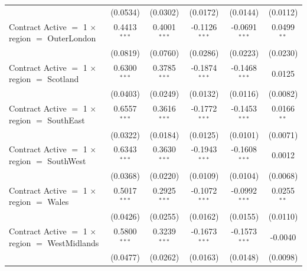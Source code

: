 \begin{table}[htbp]
\begin{tabular}{lccccc}
                                                                       & (0.0534)         & (0.0302)           & (0.0172)        & (0.0144)        & (0.0112)\\   
      Contract Active $=$ 1 $\times$ region $=$ OuterLondon            & 0.4413$^{***}$   & 0.4001$^{***}$     & -0.1126$^{***}$ & -0.0691$^{***}$ & 0.0499$^{**}$\\   
                                                                       & (0.0819)         & (0.0760)           & (0.0286)        & (0.0223)        & (0.0230)\\   
      Contract Active $=$ 1 $\times$ region $=$ Scotland               & 0.6300$^{***}$   & 0.3785$^{***}$     & -0.1874$^{***}$ & -0.1468$^{***}$ & 0.0125\\   
                                                                       & (0.0403)         & (0.0249)           & (0.0132)        & (0.0116)        & (0.0082)\\   
      Contract Active $=$ 1 $\times$ region $=$ SouthEast              & 0.6557$^{***}$   & 0.3616$^{***}$     & -0.1772$^{***}$ & -0.1453$^{***}$ & 0.0166$^{**}$\\   
                                                                       & (0.0322)         & (0.0184)           & (0.0125)        & (0.0101)        & (0.0071)\\   
      Contract Active $=$ 1 $\times$ region $=$ SouthWest              & 0.6343$^{***}$   & 0.3630$^{***}$     & -0.1943$^{***}$ & -0.1608$^{***}$ & 0.0012\\   
                                                                       & (0.0368)         & (0.0220)           & (0.0109)        & (0.0104)        & (0.0068)\\   
      Contract Active $=$ 1 $\times$ region $=$ Wales                  & 0.5017$^{***}$   & 0.2925$^{***}$     & -0.1072$^{***}$ & -0.0992$^{***}$ & 0.0255$^{**}$\\   
                                                                       & (0.0426)         & (0.0255)           & (0.0162)        & (0.0155)        & (0.0110)\\   
      Contract Active $=$ 1 $\times$ region $=$ WestMidlands           & 0.5800$^{***}$   & 0.3239$^{***}$     & -0.1673$^{***}$ & -0.1573$^{***}$ & -0.0040\\   
                                                                       & (0.0477)         & (0.0262)           & (0.0163)        & (0.0148)        & (0.0098)\\   

\end{tabular}
\end{table}
